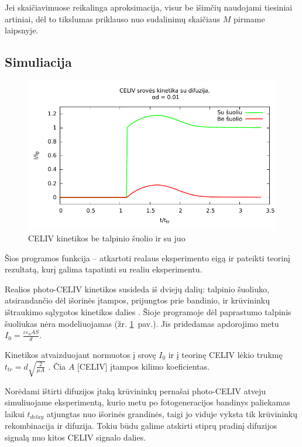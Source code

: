 Jei skaičiavimuose reikalinga aproksimacija, visur be išimčių naudojami tiesiniai artiniai, dėl to tikslumas priklauso nuo sudalinimų skaičiaus \(M\) pirmame laipsnyje.

\subsection{Simuliacija}

\begin{figure}
\centering
\includegraphics[width=\textwidth]{./media/pdf/jump.pdf} 
\caption{CELIV kinetikos be talpinio šuolio ir su juo}
\label{fig:suoliai}
\end{figure}


Šios programos funkcija -- atkartoti realaus eksperimento eigą ir pateikti teorinį rezultatą, kurį galima tapatinti su realiu eksperimentu.

Realios photo-CELIV kinetikos susideda iš dviejų dalių: talpinio šuoliuko, atsirandančio dėl išorinės įtampos, prijungtos prie bandinio, ir krūvininkų ištraukimo sąlygotos kinetikos dalies \cite{juška:4946}. Šioje programoje dėl paprastumo talpinis šuoliukas nėra modeliuojamas (žr. \ref{fig:suoliai}~pav.). Jis pridedamas apdorojimo metu \(I_0 = \frac{\varepsilon \varepsilon_0 A S}{d}\).

Kinetikos atvaizduojant normuotos į srovę \(I_0\) ir į teorinę CELIV lėkio trukmę \(t_{tr} = d \sqrt{\frac{2}{\mu A}} \) \cite{juška:155202}. Čia \(A\) [CELIV] įtampos kilimo koeficientas.

Norėdami ištirti difuzijos įtaką krūvininkų pernašai photo-CELIV atveju simuliuojame eksperimentą, kurio metu po fotogeneracijos bandinys paliekamas laikui \(t_{delay}\) atjungtas nuo išorinės grandinės, taigi jo viduje vyksta tik krūvininkų rekombinacija ir difuzija. Tokiu būdu galime atskirti stiprų pradinį difuzijos signalą nuo kitos CELIV signalo dalies.

